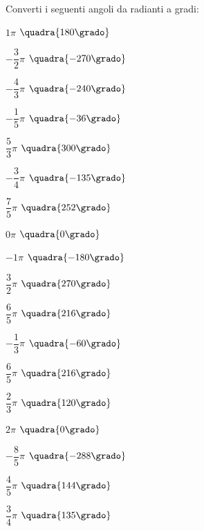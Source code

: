 \begin{esercizio}\label{ese:gonio.2}
 Converti i seguenti angoli da radianti a gradi:
\begin{multicols}{3}
 \begin{enumeratea}
  \item  \(1 \pi\)
   \hfill \(\quadra{180 \grado}\)
  \item  \(-\dfrac{3}{2} \pi\)
   \hfill \(\quadra{-270 \grado}\)
  \item  \(-\dfrac{4}{3} \pi\)
   \hfill \(\quadra{-240 \grado}\)
  \item  \(-\dfrac{1}{5} \pi\)
   \hfill \(\quadra{-36 \grado}\)
  \item  \(\dfrac{5}{3} \pi\)
   \hfill \(\quadra{300 \grado}\)
  \item  \(-\dfrac{3}{4} \pi\)
   \hfill \(\quadra{-135 \grado}\)
  \item  \(\dfrac{7}{5} \pi\)
   \hfill \(\quadra{252 \grado}\)
  \item  \(0 \pi\)
   \hfill \(\quadra{0 \grado}\)
  \item  \(-1 \pi\)
   \hfill \(\quadra{-180 \grado}\)
  \item  \(\dfrac{3}{2} \pi\)
   \hfill \(\quadra{270 \grado}\)
  \item  \(\dfrac{6}{5} \pi\)
   \hfill \(\quadra{216 \grado}\)
  \item  \(-\dfrac{1}{3} \pi\)
   \hfill \(\quadra{-60 \grado}\)
  \item  \(\dfrac{6}{5} \pi\)
   \hfill \(\quadra{216 \grado}\)
  \item  \(\dfrac{2}{3} \pi\)
   \hfill \(\quadra{120 \grado}\)
  \item  \(2 \pi\)
   \hfill \(\quadra{0 \grado}\)
  \item  \(-\dfrac{8}{5} \pi\)
   \hfill \(\quadra{-288 \grado}\)
  \item  \(\dfrac{4}{5} \pi\)
   \hfill \(\quadra{144 \grado}\)
  \item  \(\dfrac{3}{4} \pi\)
   \hfill \(\quadra{135 \grado}\)
 \end{enumeratea}
\end{multicols}
\end{esercizio}

